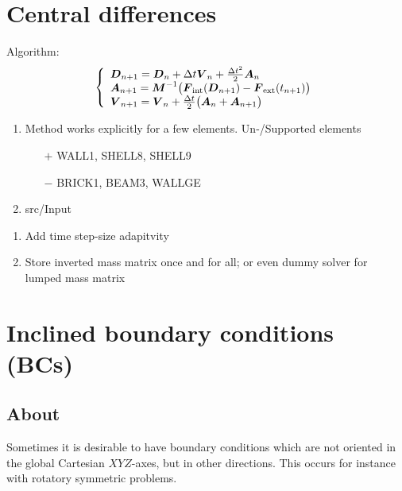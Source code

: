 \section{Central differences}
Algorithm:
\begin{gather*}
  \left\{\begin{array}{l}
     \boldsymbol{D}_{n+1} = \boldsymbol{D}_n + \Delta t \boldsymbol{V}_n + \frac{\Delta t^2}{2} \boldsymbol{A}_n
  \\
     \boldsymbol{A}_{n+1} = \boldsymbol{M}^{-1} \big( 
                     \boldsymbol{F}_{\text{int}}(\boldsymbol{D}_{n+1}) 
                     - \boldsymbol{F}_{\text{ext}}(t_{n+1})
                     \big)
  \\
     \boldsymbol{V}_{n+1} 
               = \boldsymbol{V}_n + \frac{\Delta t}{2} \big( 
               \boldsymbol{A}_n + \boldsymbol{A}_{n+1} \big)
  \end{array}\right.
\end{gather*}
\begin{enumerate}
\item Method works explicitly for a few elements. Un-/Supported elements
  \begin{itemize}
  \item[$+$] WALL1, SHELL8, SHELL9
  \item[$-$] BRICK1, BEAM3, WALLGE
  \end{itemize}
\item src/Input 
\end{enumerate}

\begin{enumerate}
\item Add time step-size adapitvity
\item Store inverted mass matrix once and for all; or even dummy solver for
  lumped mass matrix
\end{enumerate}

\section{Inclined boundary conditions (BCs)}

\subsection{About}
Sometimes it is desirable to have boundary conditions
which are not oriented in the global Cartesian $XYZ$-axes,
but in other directions. This occurs for instance with
rotatory symmetric problems.


